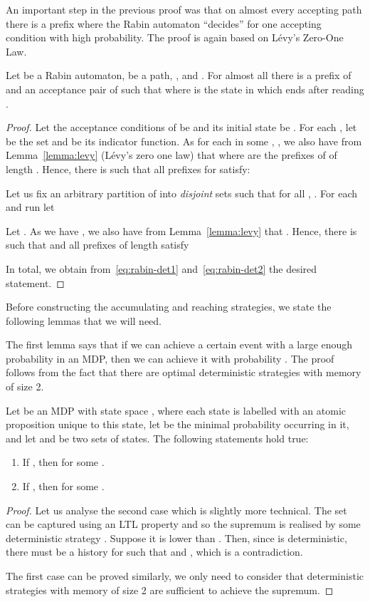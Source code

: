 \documentclass[a4paper,UKenglish]{lipics}
\begin{document}
An important step in the previous proof was that on almost every accepting path there is a prefix where the Rabin automaton ``decides'' for one accepting condition with high probability.
The proof is again based on Lévy's Zero-One Law.

\begin{lemma}\label{lemma:rabin-determined}
	Let  be a Rabin automaton,  be a path, , and .
For almost all  there is a prefix  of  and an acceptance pair  of  such that	
	where  is the state in which  ends after reading . 
\end{lemma}
\begin{proof}
	Let the acceptance conditions of  be  and its initial state be . 
For each , let  be the set  and  be its indicator function.
As for each  in some 
, 
	, we also have from Lemma~\ref{lemma:levy} (Lévy's zero one law) that  where  are the prefixes of  of length . 
Hence, there is  such that all prefixes  for  satisfy:

	
	Let us fix an arbitrary partition of  into \emph{disjoint} sets  such that for all , . 
For each  and run  let 
	


	Let . 
As we have , we also have from Lemma~\ref{lemma:levy} that .  Hence, there is  such that  and all prefixes  of length  satisfy
	
	


	\noindent
	In total, we obtain from~\ref{eq:rabin-det1} and~\ref{eq:rabin-det2} the desired statement.
\end{proof}



Before constructing the accumulating and reaching strategies, we state the following  lemmas that we will need.


The first lemma says that if we can achieve a certain event with a large enough probability in an MDP, then we can achieve it with probability . The proof follows from the fact that there are optimal deterministic strategies with memory of size 2.
\begin{lemma}\label{lemma:pone}
	Let  be an MDP with state space , where each state  is labelled with an atomic proposition  unique to this state, let  be the minimal probability occurring in it, and let  and  be two sets of states. The following statements hold true:
	\begin{enumerate}
		\item  If , then  for some .
		\item  If , then  for some .
	\end{enumerate}
\end{lemma}
\begin{proof}
	Let us analyse the second case which is slightly more technical.
	The set  can be captured using an LTL property
	and so the supremum is realised by some deterministic strategy . Suppose it is lower than .
	Then, since  is deterministic, there must be a history  for 
	such that  and , which is a contradiction.
	
	The first case can be proved similarly, we only need to consider that deterministic strategies with memory of size 2 are
	sufficient to achieve the supremum.
\end{proof}
\end{document}
